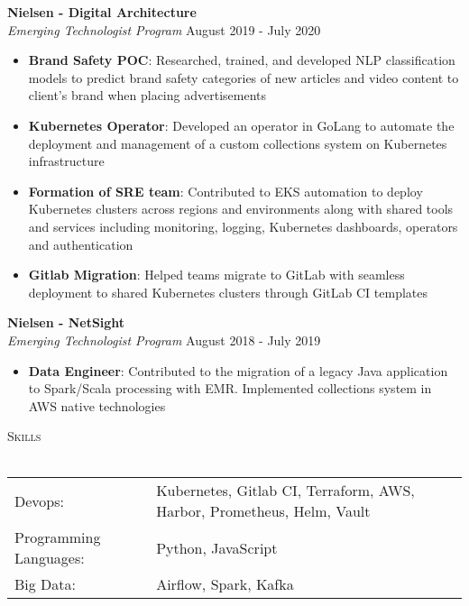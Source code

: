\documentclass[a4paper]{article}
\newcommand{\lineunder} {
    \vspace*{-8pt} \\
    \hspace*{-18pt} \hrulefill \\
}
\newcommand{\header} [1] {
    {\hspace*{-18pt}\vspace*{6pt} \textsc{#1}}
    \vspace*{-6pt} \lineunder
}
\begin{document}
\textbf{Nielsen - Digital Architecture}\\
\textit{Emerging Technologist Program} \hfill August 2019 - July 2020\\
\vspace{-1mm}
\begin{itemize} \itemsep 1pt
	\item \textbf{Brand Safety POC}: Researched, trained, and developed NLP classification models to predict brand safety categories of new articles and video content to client's brand when placing advertisements
    \item \textbf{Kubernetes Operator}: Developed an operator in GoLang to automate the deployment and management of a custom collections system on Kubernetes infrastructure
    \item \textbf{Formation of SRE team}: Contributed to EKS automation to deploy Kubernetes clusters across regions and environments along with shared tools and services including monitoring, logging, Kubernetes dashboards, operators and authentication
    \item \textbf{Gitlab Migration}: Helped teams migrate to GitLab with seamless deployment to shared Kubernetes clusters through GitLab CI templates
\end{itemize}

\textbf{Nielsen - NetSight}\\
\textit{Emerging Technologist Program} \hfill August 2018 - July 2019\\
\vspace{-1mm}
\begin{itemize} \itemsep 1pt
	\item \textbf{Data Engineer}: Contributed to the migration of a legacy Java application to Spark/Scala processing with EMR. Implemented collections system in AWS native technologies
\end{itemize}

\header{Skills}
\begin{tabular}{ l l }
	Devops:                & Kubernetes, Gitlab CI, Terraform, AWS, Harbor, Prometheus, Helm, Vault \\
	Programming Languages: & Python, JavaScript                                                     \\
	Big Data:              & Airflow, Spark, Kafka                                                  \\
\end{tabular}
\vspace{3mm}
\end{document}

